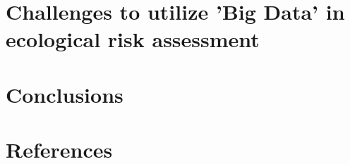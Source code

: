 

\section{Challenges to utilize 'Big Data' in ecological risk assessment}




\section{Conclusions}






\section{References}
\printbibliography[heading=none]

